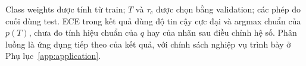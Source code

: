 Class weights được tính từ train; $T$ và $\tau_c$ được chọn bằng validation; các phép đo cuối dùng test. ECE trong kết quả dùng độ tin cậy cực đại và argmax chuẩn của $p(T)$, chưa đo tính hiệu chuẩn của $q$ hay của nhãn sau điều chỉnh hệ số. Phân luồng là ứng dụng tiếp theo của kết quả, với chính sách nghiệp vụ trình bày ở Phụ lục~\ref{app:application}.
